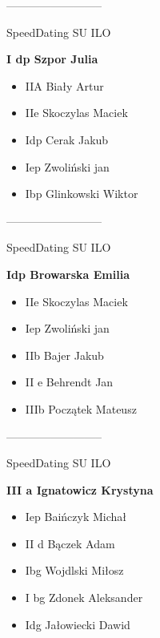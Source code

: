 \documentclass[a4paper,10pt]{article}
\begin{document}
\begin{multicols}{3}
\begin{minipage}[l]{\textwidth}
\end{minipage}



\begin{minipage}[l]{\textwidth}
--------------------------

  \footnotesize{SpeedDating SU ILO}

  \bfseries{I dp Szpor Julia}

  \begin{itemize}
    \item IIA Biały Artur
    \item IIe Skoczylas Maciek
    \item Idp Cerak Jakub
    \item Iep Zwoliński jan
    \item Ibp Glinkowski Wiktor

    \end{itemize}



\end{minipage}



\begin{minipage}[l]{\textwidth}
--------------------------

  \footnotesize{SpeedDating SU ILO}

  \bfseries{Idp Browarska Emilia}

  \begin{itemize}
    \item IIe Skoczylas Maciek
    \item Iep Zwoliński jan
    \item IIb Bajer Jakub
    \item II e Behrendt Jan
    \item IIIb Początek Mateusz

    \end{itemize}



\end{minipage}



\begin{minipage}[l]{\textwidth}
--------------------------

  \footnotesize{SpeedDating SU ILO}

  \bfseries{III a Ignatowicz Krystyna}

  \begin{itemize}
    \item Iep Baińczyk Michał
    \item II d Bączek Adam
    \item Ibg Wojdlski Miłosz
    \item I bg Zdonek Aleksander
    \item Idg Jałowiecki Dawid


\end{itemize}
\end{minipage}
\end{multicols}
\end{document}
